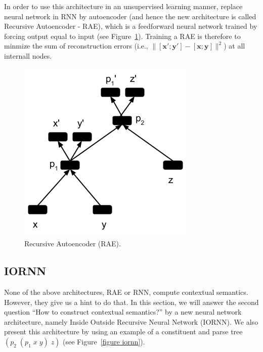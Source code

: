 \documentclass[11pt]{article}
\begin{document}
In order to use this architecture in an unsupervised learning manner, 
\cite{socher2011semi} replace neural network in RNN by autoencoder 
(and hence the new architecture is called Recursive Autoencoder - RAE), 
which is a feedforward neural network trained by forcing output equal to 
input (see Figure~\ref{figure rae}). Training a RAE is therefore to minmize 
the sum of reconstruction errors 
(i.e., $\|[\mathbf{x}';\mathbf{y}'] - [\mathbf{x};\mathbf{y}]\|^2$) at all internall nodes. 

\begin{figure}[h!]
	\center
	\includegraphics[scale=0.5]{RAE.png}
	\caption{Recursive Autoencoder (RAE).}
	\label{figure rae}
\end{figure}


\subsection{IORNN}
\label{subsection nlm}

None of the above architectures, RAE or RNN, compute contextual semantics. 
However, they give us a hint to do that. In this section, we will answer the second 
question ``How to construct contextual semantics?'' by a new neural network 
architecture, namely Inside Outside Recursive Neural Network (IORNN). We also 
present this architecture by using an example of a constituent and parse tree 
$(p_2 \; (p_1 \; x \; y) \; z)$ (see Figure~\ref{figure iornn}).
\end{document}
